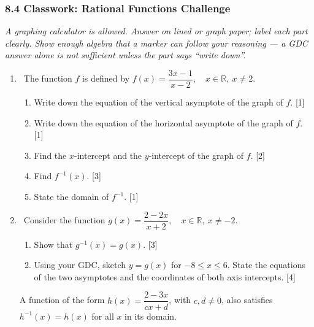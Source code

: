 \documentclass[12pt, twoside]{article}
\begin{document}
\subsubsection*{8.4 Classwork: Rational Functions Challenge}

\noindent\emph{A graphing calculator is allowed. Answer on lined or graph paper; label
each part clearly. Show enough algebra that a marker can follow your reasoning ---
a GDC answer alone is not sufficient unless the part says ``write down''.}

\begin{enumerate}[itemsep=0.25cm]

\item[1.] [Maximum mark: 8] \ The function $f$ is defined by
$\displaystyle f(x)=\dfrac{3x-1}{x-2}, \quad x\in\mathbb{R},\ x\ne 2.$

\begin{enumerate}[itemsep=0.1cm]
  \item Write down the equation of the vertical asymptote of the graph of $f$. \hfill [1]
  \item Write down the equation of the horizontal asymptote of the graph of $f$. \hfill [1]
  \item Find the $x$-intercept and the $y$-intercept of the graph of $f$. \hfill [2]
  \item Find $f^{-1}(x)$. \hfill [3]
  \item State the domain of $f^{-1}$. \hfill [1]
\end{enumerate}

\medskip

\item[2.] [Maximum mark: 10] \ Consider the function
$\displaystyle g(x)=\dfrac{2-2x}{x+2}, \quad x\in\mathbb{R},\ x\ne -2.$

\begin{enumerate}[itemsep=0.1cm]
  \item Show that $g^{-1}(x)=g(x)$. \hfill [3]
  \item Using your GDC, sketch $y=g(x)$ for $-8\le x\le 6$. State the equations of the
  two asymptotes and the coordinates of both axis intercepts. \hfill [4]
\end{enumerate}

A function of the form $\displaystyle h(x)=\dfrac{2-3x}{cx+d}$, with $c,d\ne 0$, also
satisfies $h^{-1}(x)=h(x)$ for all $x$ in its domain.


\end{enumerate}
\end{document}
